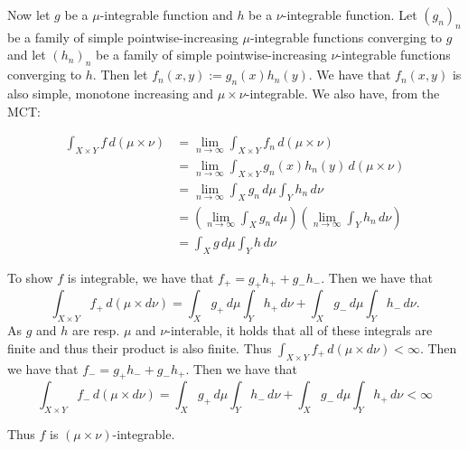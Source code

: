 \documentclass{article}
\theoremstyle{definition}
\numberwithin{theorem}{section}
\numberwithin{equation}{section}
\begin{document}
Now let $g$ be a $\mu$-integrable function and $h$ be a $\nu$-integrable function. Let $(g_n)_n$ be a family of simple pointwise-increasing $\mu$-integrable functions converging to $g$ and let  $(h_n)_n$ be a family of simple pointwise-increasing $\nu$-integrable functions converging to $h$. Then let $f_n(x, y) := g_n(x) h_n(y)$. We have that $f_n(x, y)$ is also simple, monotone increasing and $\mu \times \nu$-integrable. We also have, from the MCT:

\begin{align*}
	\int_{X \times Y} f \, d(\mu \times \nu) &= \lim_{n \rightarrow \infty} \int_{X \times Y} f_n \, d(\mu \times \nu)\\
	&= \lim_{n \rightarrow \infty} \int_{X \times Y} g_n(x) h_n(y) \, d(\mu \times \nu)\\
	&= \lim_{n \rightarrow \infty} \int_X g_n \, d\mu \int_Y h_n \, d\nu\\
	&= \left(\lim_{n \rightarrow \infty} \int_X g_n \, d\mu\right) \left(\lim_{n \rightarrow \infty}\int_Y h_n \, d\nu\right)\\
	&= \int_X g \, d\mu \int_Y h \, d\nu
\end{align*}

To show $f$ is integrable, we have that $f_+ = g_+ h_+ + g_- h_-$. Then we have that 
\begin{equation}
	\int_{X \times Y} f_+ \, d(\mu \times d\nu) = \int_X g_+ \, d\mu \int_Y h_+ \, d\nu +  \int_X g_- \, d\mu \int_Y h_- \, d\nu.
\end{equation}
As $g$ and $h$ are resp. $\mu$ and $\nu$-interable, it holds that all of these integrals are finite and thus their product is also finite. Thus $\int_{X \times Y} f_+ \, d(\mu \times d\nu) < \infty$. Then we have that $f_- = g_+ h_- + g_- h_+$. Then we have that
\begin{equation}
	\int_{X \times Y} f_- \, d(\mu \times d\nu) = \int_X g_+ \, d\mu \int_Y h_- \, d\nu +  \int_X g_- \, d\mu \int_Y h_+ \, d\nu < \infty
\end{equation}

Thus $f$ is $(\mu \times \nu)$-integrable. 
\end{document}
